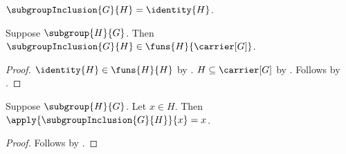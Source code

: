 \begin{definition}\label{subgroup_inclusion}
    $\subgroupInclusion{G}{H}=\identity{H}$.
\end{definition}

\begin{proposition}\label{subgroup_inclusion_type}
    Suppose $\subgroup{H}{G}$.
    Then $\subgroupInclusion{G}{H}\in
        \funs{H}{\carrier[G]}$.
\end{proposition}
\begin{proof}
    $\identity{H}\in\funs{H}{H}$ by .
    $H\subseteq\carrier[G]$ by .
    Follows by
        .
\end{proof}

\begin{proposition}\label{subgroup_inclusion_apply}
    Suppose $\subgroup{H}{G}$.
    Let $x\in H$.
    Then $\apply{\subgroupInclusion{G}{H}}{x}=x$.
\end{proposition}
\begin{proof}
    Follows by .
\end{proof}
